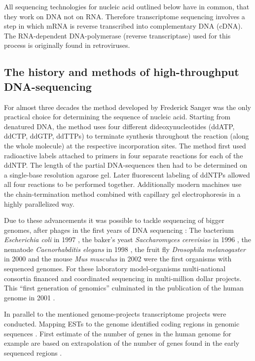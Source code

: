 All sequencing technologies for nucleic acid outlined below have in
common, that they work on DNA not on RNA. Therefore transcriptome
sequencing involves a step in which mRNA is reverse transcribed into
complementary DNA (cDNA). The RNA-dependent DNA-polymerase (reverse
transcriptase) used for this process is originally found in
retroviruses.

\subsection{The history and methods of high-throughput DNA-sequencing}
\label{his-seq}

For almost three decades the method developed by Frederick Sanger
\cite{pmid271968} was the only practical choice for determining the
sequence of nucleic acid. Starting from denatured DNA, the method uses
four different dideoxynucleotides (ddATP, ddCTP, ddGTP, ddTTPs) to
terminate synthesis throughout the reaction (along the whole molecule)
at the respective incorporation sites. The method first used
radioactive labels attached to primers in four separate reactions for
each of the ddNTP. The length of the partial DNA-sequences then had to
be determined on a single-base resolution agarose gel. Later
fluorescent labeling of ddNTPs allowed all four reactions to be
performed together. Additionally modern machines use the
chain-termination method combined with capillary gel electrophoresis
\cite{pmid2326186} in a highly parallelized way.

Due to these advancements it was possible to tackle sequencing of
bigger genomes, after phages in the first years of DNA sequencing
\cite{pmid1264203}: The bacterium \textit{Escherichia coli} in 1997
\cite{pmid9278503}, the baker's yeast \textit{Saccharomyces
  cerevisiae} in 1996 \cite{pmid8849441}, the nematode
\textit{Caenorhabditis elegans} in 1998 \cite{pmid9851916}, the fruit
fly \textit{Drosophila melanogaster} in 2000 \cite{adams2000genome}
and the mouse \textit{Mus musculus} in 2002 \cite{pmid12466850} were
the first organisms with sequenced genomes. For these laboratory
model-organisms multi-national consortia financed and coordinated
sequencing in multi-million dollar projects. This ``first generation
of genomics'' culminated in the publication of the human genome in
2001 \cite{pmid11181995}.

In parallel to the mentioned genome-projects transcriptome projects
were conducted. Mapping ESTs to the genome identified coding regions
in genomic sequences \cite{pmid2047873}. First estimate of the number
of genes in the human genome for example are based on extrapolation of
the number of genes found in the early sequenced regions
\cite{pmid7920649}.


